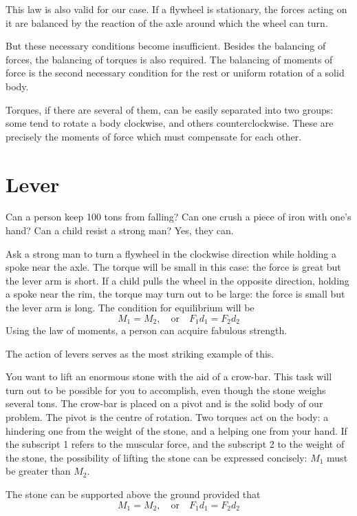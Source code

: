 This law is also valid for our case. If a flywheel is stationary, the forces acting on it are balanced by the reaction of the axle around which the wheel can turn.

But these necessary conditions become insufficient. Besides the balancing of forces, the balancing of torques is also required. The balancing of moments of force is the second necessary condition for the rest or uniform rotation of a solid body.

Torques, if there are several of them, can be easily separated into two groups: some tend to rotate a body clockwise, and others counterclockwise. These are precisely the moments of force which must compensate for each other.

\section{Lever}

Can a person keep 100 tons from falling? Can one crush
a piece of iron with one's hand? Can a child resist a strong
man? Yes, they can.

Ask a strong man to turn a flywheel in the clockwise direction while holding a spoke near the axle. The torque will be small in this case: the force is great but the lever arm is short. If a child pulls the wheel in the opposite direction, holding a spoke near the rim, the torque may turn out to be large: the force is small but the lever arm is long. The condition for equilibrium will be
\begin{equation*}%
M_{1} = M_{2}, \quad \textrm{or} \quad  F_{1}d_{1} = F_{2}d_{2}
\end{equation*}
Using the law of moments, a person can acquire fabulous strength.

The action of levers serves as the most striking example
of this.

You want to lift an enormous stone with the aid of a
crow-bar. This task will turn out to be possible for you
to accomplish, even though the stone weighs several tons.
The crow-bar is placed on a pivot and is the solid body
of our problem. The pivot is the centre of rotation. Two
torques act on the body: a hindering one from the weight
of the stone, and a helping one from your hand. If the
subscript 1 refers to the muscular force, and the subscript
2 to the weight of the stone, the possibility of lifting
the stone can be expressed concisely: $M_{1}$ must be greater than $M_{2}$.

The stone can be supported above the ground provided that
\begin{equation*}%
M_{1} = M_{2}, \quad \textrm{or} \quad  F_{1}d_{1} = F_{2}d_{2}
\end{equation*}

